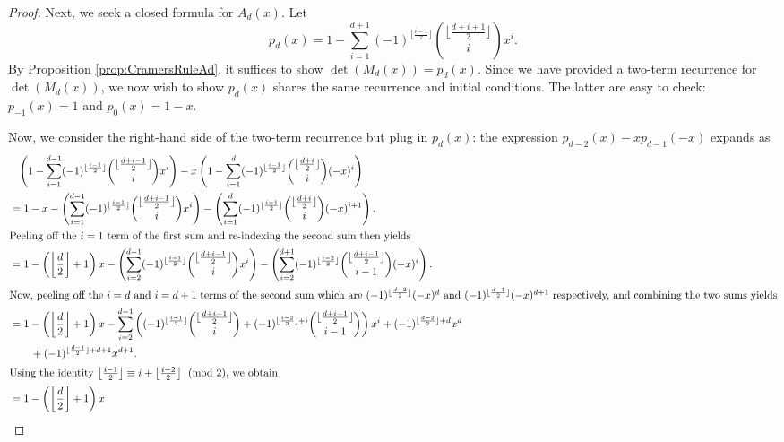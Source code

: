 \documentclass{amsart}
\theoremstyle{definition}
\begin{document}
\begin{proof}
    Next, we seek a closed formula for $A_d(x)$. Let 
    \[p_d(x) = 1 - \sum_{i=1}^{d+1} (-1)^{\lfloor \frac{i-1}{2}\rfloor} {\lfloor \frac{d+i+1}{2}\rfloor \choose i}x^i.\]
    By Proposition \ref{prop:CramersRuleAd}, it suffices to show $\det(M_d(x)) = p_d(x)$. Since we have provided a two-term recurrence for $\det(M_d(x))$, we now wish to  show $p_d(x)$ shares the same recurrence and initial conditions. The latter are easy to check: $p_{-1}(x) = 1$ and $p_0(x) = 1-x$.

    Now, we consider the right-hand side of the two-term recurrence but plug in $p_d(x)$: the expression
    $p_{d-2}(x)-xp_{d-1}(-x)$ expands as \begin{align*}
    &\phantom{=}\left(1 - \sum_{i=1}^{d-1} (-1)^{\lfloor \frac{i-1}{2}\rfloor} {\lfloor \frac{d+i-1}{2}\rfloor \choose i}x^i\right) - x \left(1-\sum_{i=1}^{d} (-1)^{\lfloor \frac{i-1}{2}\rfloor} {\lfloor \frac{d+i}{2}\rfloor \choose i}(-x)^i\right)\\
     &= 1-x-\left(\sum_{i=1}^{d-1} (-1)^{\lfloor \frac{i-1}{2}\rfloor} {\lfloor \frac{d+i-1}{2}\rfloor \choose i}x^i\right) - \left(\sum_{i=1}^{d} (-1)^{\lfloor \frac{i-1}{2}\rfloor} {\lfloor \frac{d+i}{2}\rfloor \choose i}(-x)^{i+1}\right).\\
     \intertext{Peeling off the $i=1$ term of the first sum and re-indexing
     the second sum then yields}
     &= 1-\left(\left\lfloor \frac{d}{2}\right\rfloor+1\right)x-\left(\sum_{i=2}^{d-1} (-1)^{\lfloor \frac{i-1}{2}\rfloor} {\lfloor \frac{d+i-1}{2}\rfloor \choose i}x^i\right)
     - \left(\sum_{i=2}^{d+1} (-1)^{\lfloor \frac{i-2}{2}\rfloor} {\lfloor \frac{d+i-1}{2}\rfloor \choose i-1}(-x)^i\right).\\
     \intertext{Now, peeling off the $i=d$ and $i=d+1$ terms of the second sum which are $(-1)^{\lfloor \frac{d-2}{2}\rfloor}(-x)^d$ and $(-1)^{\lfloor \frac{d-1}{2}\rfloor}(-x)^{d+1}$ respectively,
     and combining the two sums yields}
     &= 1-\left(\left\lfloor \frac{d}{2}\right\rfloor+1\right)x
     -\sum_{i=2}^{d-1} \left((-1)^{\lfloor \frac{i-1}{2}\rfloor} {\lfloor \frac{d+i-1}{2}\rfloor \choose i} + (-1)^{\lfloor \frac{i-2}{2}\rfloor+i} {\lfloor \frac{d+i-1}{2}\rfloor \choose i-1}\right) x^i+(-1)^{\lfloor \frac{d-2}{2}\rfloor+d}x^d \\
     &\qquad + (-1)^{\lfloor \frac{d-1}{2}\rfloor+d+1}x^{d+1}.\\
     \intertext{Using the identity $\left\lfloor \frac{i-1}{2}\right\rfloor \equiv i + \left\lfloor \frac{i-2}{2}\right\rfloor \pmod{2}$, we obtain}
     &= 1-\left(\left\lfloor \frac{d}{2}\right\rfloor+1\right)x

\end{align*}
\end{proof}
\end{document}
